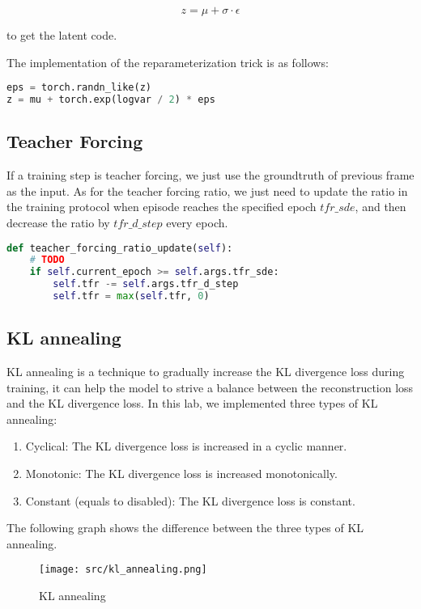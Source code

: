\begin{equation}
    z = \mu + \sigma \cdot \epsilon
\end{equation}

to get the latent code.

The implementation of the reparameterization trick is as follows:

\begin{lstlisting}[language=Python]
eps = torch.randn_like(z)
z = mu + torch.exp(logvar / 2) * eps
\end{lstlisting}


\subsection{Teacher Forcing}
If a training step is teacher forcing, we just use the groundtruth of previous frame as the input.
As for the teacher forcing ratio, we just need to update the ratio in the training protocol when episode reaches the specified epoch $tfr\_sde$, and then decrease the ratio by $tfr\_d\_step$ every epoch.

\begin{lstlisting}[language=Python]
def teacher_forcing_ratio_update(self):
    # TODO
    if self.current_epoch >= self.args.tfr_sde:
        self.tfr -= self.args.tfr_d_step
        self.tfr = max(self.tfr, 0)
\end{lstlisting}

\subsection{KL annealing}
KL annealing is a technique to gradually increase the KL divergence loss during training, it can help the model to strive a balance between the reconstruction loss and the KL divergence loss.
In this lab, we implemented three types of KL annealing:
\begin{enumerate}
    \item Cyclical: The KL divergence loss is increased in a cyclic manner.
    \item Monotonic: The KL divergence loss is increased monotonically.
    \item Constant (equals to disabled): The KL divergence loss is constant.
\end{enumerate}
The following graph shows the difference between the three types of KL annealing.

\begin{figure}[H]
    \centering
    \texttt{[image: src/kl\_annealing.png]}
    \caption{KL annealing}
\end{figure}

